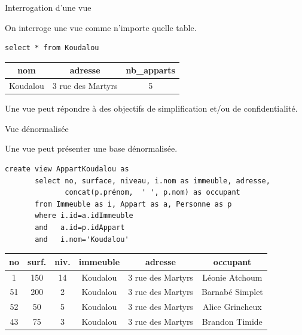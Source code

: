 \begin{frame}[fragile]{Interrogation d'une vue}

On interroge une vue comme n'importe quelle table.

\vfill

\begin{verbatim}
select * from Koudalou
\end{verbatim}


\vfill

\begin{tabular}{c|c|c}
\textbf{nom} & \textbf{adresse} & \textbf{nb\_apparts}\\ \hline 
Koudalou & 3 rue des Martyrs & 5\\ \hline 
\end{tabular}

\vfill

\begin{blocgauche}
Une vue peut répondre à des objectifs de \alert{simplification}
et/ou de \alert{confidentialité}.
\end{blocgauche}

\end{frame}



\begin{frame}[fragile]{Vue dénormalisée}

Une vue peut présenter une base dénormalisée.

\vfill

\begin{verbatim}
create view AppartKoudalou as 
       select no, surface, niveau, i.nom as immeuble, adresse,
              concat(p.prénom,  ' ', p.nom) as occupant 
       from Immeuble as i, Appart as a, Personne as p
       where i.id=a.idImmeuble
       and   a.id=p.idAppart
       and   i.nom='Koudalou'
\end{verbatim}

\vfill
\begin{small}
\begin{tabular}{c|c|c|c|c|c}
\textbf{no} & \textbf{surf.} & \textbf{niv.} & \textbf{immeuble} & \textbf{adresse} & \textbf{occupant}\\ \hline 
1 & 150 & 14 & Koudalou & 3 rue des Martyrs & Léonie Atchoum\\ \hline 
51 & 200 & 2 & Koudalou & 3 rue des Martyrs & Barnabé Simplet\\ \hline 
52 & 50 & 5 & Koudalou & 3 rue des Martyrs & Alice Grincheux\\ \hline 
43 & 75 & 3 & Koudalou & 3 rue des Martyrs & Brandon Timide\\ \hline 
\end{tabular}
\end{small}
\end{frame}


